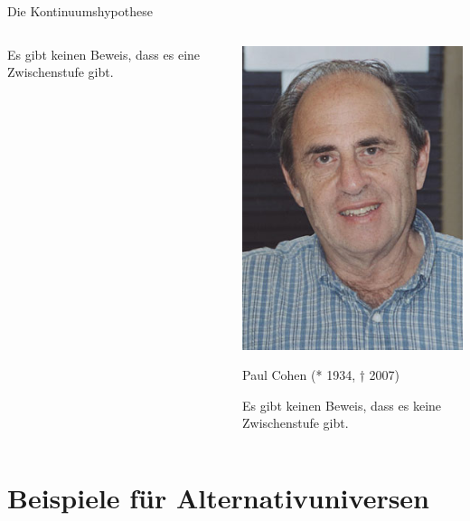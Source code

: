 \documentclass[12pt,compress,ngerman,utf8,t]{beamer}
\begin{document}
\begin{frame}{Die Kontinuumshypothese}
\begin{columns}[t]
\begin{column}{0.34\textwidth}
      Es gibt keinen Beweis, dass es eine Zwischenstufe gibt.
    \end{column}
    \pause

    \begin{column}{0.34\textwidth}
      \centering\includegraphics[height=0.5\textheight]{paul-cohen} \\
      {\scriptsize Paul Cohen (* 1934, † 2007)\par}
      \bigskip

      Es gibt keinen Beweis, dass es keine Zwischenstufe gibt.
    \end{column}
  \end{columns}
\end{frame}


\section[Beispiele]{Beispiele für Alternativuniversen}
\end{document}
